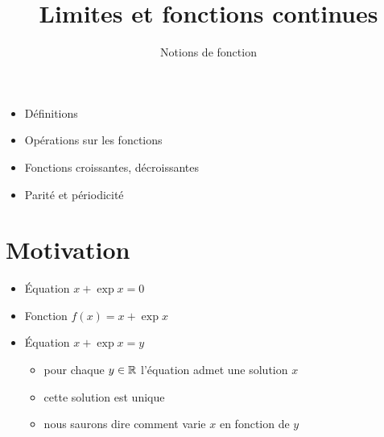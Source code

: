 







\title{{\bf Limites et fonctions continues}}
\subtitle{Notions de fonction}

\begin{frame}
  
  \debutmontitre

  \pause

{\footnotesize
\hfill
{}
\begin{minipage}{0.6\textwidth}
  \begin{itemize}
    \item<3-> Définitions
    \item<4-> Opérations sur les fonctions
    \item<5-> Fonctions croissantes, décroissantes
    \item<6-> Parité et périodicité
  \end{itemize}
\end{minipage}
}

\end{frame}

\setcounter{framenumber}{0}




\section{Motivation}


\begin{frame}

\begin{itemize}
  \item \'Equation $x+\exp x=0$
\pause
  \item Fonction $f(x)=x + \exp x$
\pause
  \item \'Equation $x+\exp x=y$ 
\pause  
  \begin{itemize}
    \item pour chaque $y \in \mathbb{R}$ l'équation admet une solution $x$
\pause
    \item cette solution est unique
\pause    
    \item nous saurons dire comment varie $x$ en fonction de $y$
  \end{itemize}  
\end{itemize}



\end{frame}


